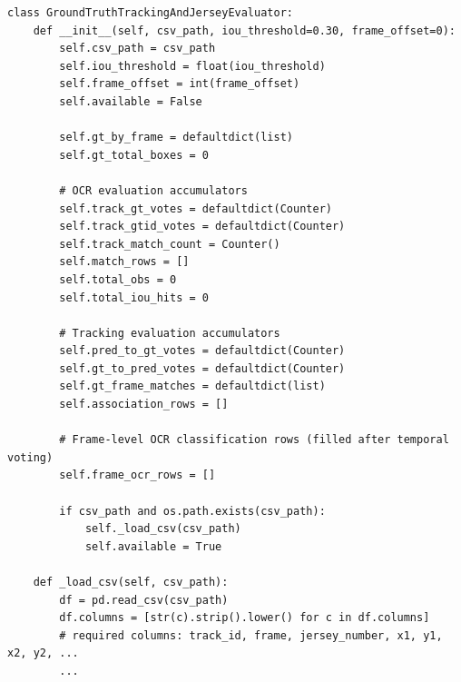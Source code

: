 \begin{lstlisting}[caption={\texttt{GroundTruthTrackingAndJerseyEvaluator} --- initialization and accumulator structure for the ground-truth evaluation described in Section~\ref{sec:gt-eval}.}]
class GroundTruthTrackingAndJerseyEvaluator:
    def __init__(self, csv_path, iou_threshold=0.30, frame_offset=0):
        self.csv_path = csv_path
        self.iou_threshold = float(iou_threshold)
        self.frame_offset = int(frame_offset)
        self.available = False

        self.gt_by_frame = defaultdict(list)
        self.gt_total_boxes = 0

        # OCR evaluation accumulators
        self.track_gt_votes = defaultdict(Counter)
        self.track_gtid_votes = defaultdict(Counter)
        self.track_match_count = Counter()
        self.match_rows = []
        self.total_obs = 0
        self.total_iou_hits = 0

        # Tracking evaluation accumulators
        self.pred_to_gt_votes = defaultdict(Counter)
        self.gt_to_pred_votes = defaultdict(Counter)
        self.gt_frame_matches = defaultdict(list)
        self.association_rows = []

        # Frame-level OCR classification rows (filled after temporal voting)
        self.frame_ocr_rows = []

        if csv_path and os.path.exists(csv_path):
            self._load_csv(csv_path)
            self.available = True

    def _load_csv(self, csv_path):
        df = pd.read_csv(csv_path)
        df.columns = [str(c).strip().lower() for c in df.columns]
        # required columns: track_id, frame, jersey_number, x1, y1, x2, y2, ...
        ...
\end{lstlisting}
